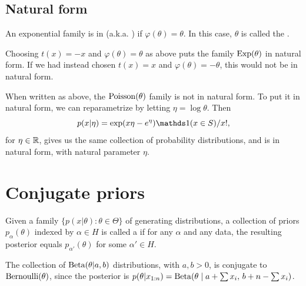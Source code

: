 \documentclass[12pt]{article}
\begin{document}
\subsection{Natural form}

An exponential family is in  (a.k.a. ) if $\varphi(\theta) =\theta$. In this case, $\theta$ is called the .

\begin{example}[Exponential]
Choosing $t(x) =-x$ and $\varphi(\theta) = \theta$ as above puts the family $\operatorname*{Exp}(\theta)$ in natural form. If we had instead chosen $t(x) = x$ and $\varphi(\theta) = -\theta$, this would not be in natural form.
\end{example}

\begin{example}[Poisson]
When written as above, the $\operatorname*{Poisson}(\theta)$ family is not in natural form. To put it in natural form, we can reparametrize by letting $\eta = \log\theta$. Then 
$$ p(x|\eta) = \exp(x\eta -e^\eta)\I(x\in S)/x!,$$
for $\eta\in\mathbb{R}$, gives us the same collection of probability distributions, and is in natural form, with natural parameter $\eta$.
\end{example}



\section{Conjugate priors}

Given a family $\{p(x|\theta):\theta\in\Theta\}$ of generating distributions, a collection of priors $p_\alpha(\theta)$ indexed by $\alpha\in H$ is called a  if for any $\alpha$ and any data, the resulting posterior equals $p_{\alpha'}(\theta)$  for some $\alpha'\in H$.

\begin{example}
The collection of $\operatorname*{Beta}(\theta|a,b)$ distributions, with $a,b>0$, is conjugate to $\operatorname*{Bernoulli}(\theta)$, since the posterior is $p(\theta|x_{1:n}) = \operatorname*{Beta}(\theta\mid a +\sum x_i, \, b + n-\sum x_i)$.
\end{example}
\end{document}
